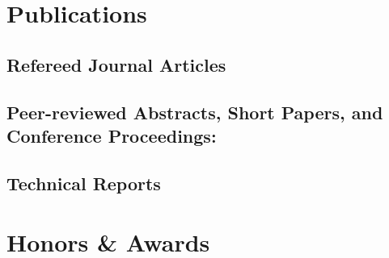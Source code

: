 \documentclass[11pt,a4paper,sans]{moderncv}        %
\begin{document}

\section{Publications}
\nocite{*}
\subsection{Refereed Journal Articles}
\printbibliography[heading=none,type=article]

\subsection{Peer-reviewed Abstracts, Short Papers, and Conference Proceedings:}
\printbibliography[heading=none, type=inproceedings]

\subsection{Technical Reports}
\printbibliography[heading=none,type=report]



\section{Honors \& Awards}
\end{document}
